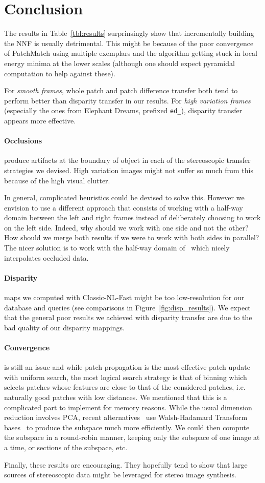 

\section{Conclusion}

The results in Table~\ref{tbl:results} surprinsingly show that incrementally building the NNF is usually detrimental.
This might be because of the poor convergence of PatchMatch using multiple exemplars and the algorithm getting stuck in local energy minima at the lower scales (although one should expect pyramidal computation to help against these).

For \emph{smooth frames}, whole patch and patch difference transfer both tend to perform better than disparity transfer in our results.
For \emph{high variation frames} (especially the ones from Elephant Dreams, prefixed \texttt{ed\_}), disparity transfer appears more effective.

\paragraph{Occlusions} produce artifacts at the boundary of object in each of the stereoscopic transfer strategies we devised.
High variation images might not suffer so much from this because of the high visual clutter.

In general, complicated heuristics could be devised to solve this.
However we envision to use a different approach that consists of working with a half-way domain between the left and right frames instead of deliberately choosing to work on the left side.
Indeed, why should we work with one side and not the other? How should we merge both results if we were to work with both sides in parallel?
The nicer solution is to work with the half-way domain of~\cite{Liao14} which nicely interpolates occluded data.

\paragraph{Disparity} maps we computed with Classic-NL-Fast might be too low-resolution for our database and queries (see comparisons in Figure~\ref{fig:disp_results}).
We expect that the general poor results we achieved with disparity transfer are due to the bad quality of our disparity mappings.

\paragraph{Convergence} is still an issue and while patch propagation is the most effective patch update with uniform search, the most logical search strategy is that of binning which selects patches whose features are close to that of the considered patches, i.e. naturally good patches with low distances.
We mentioned that this is a complicated part to implement for memory reasons.
While the usual dimension reduction involves PCA, recent alternatives~\cite{He12} use Walsh-Hadamard Transform bases~\cite{Hel05} to produce the subspace much more efficiently.
We could then compute the subspace in a round-robin manner, keeping only the subspace of one image at a time, or sections of the subspace, etc.

Finally, these results are encouraging.
They hopefully tend to show that large sources of stereoscopic data might be leveraged for stereo image synthesis.